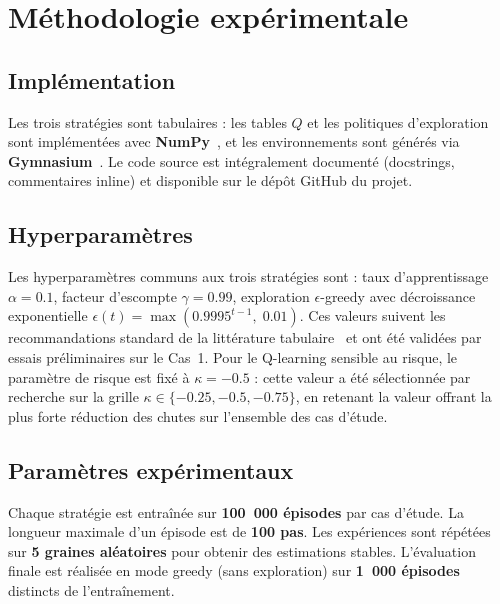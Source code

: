 \documentclass{article}
\begin{document}
\section{Méthodologie expérimentale}

\subsection{Implémentation}

Les trois stratégies sont tabulaires : les tables $Q$ et les politiques d'exploration sont implémentées avec \textbf{NumPy}~\citep{numpy}, et les environnements sont générés via \textbf{Gymnasium}~\citep{towers2024gymnasium}. Le code source est intégralement documenté (docstrings, commentaires inline) et disponible sur le dépôt GitHub du projet.

\subsection{Hyperparamètres}

Les hyperparamètres communs aux trois stratégies sont : taux d'apprentissage $\alpha = 0.1$, facteur d'escompte $\gamma = 0.99$, exploration $\epsilon$-greedy avec décroissance exponentielle $\epsilon(t) = \max(0.9995^{t-1},\; 0.01)$. Ces valeurs suivent les recommandations standard de la littérature tabulaire~\citep{rlbook} et ont été validées par essais préliminaires sur le Cas~1. Pour le Q-learning sensible au risque, le paramètre de risque est fixé à $\kappa = -0.5$ : cette valeur a été sélectionnée par recherche sur la grille $\kappa \in \{-0.25, -0.5, -0.75\}$, en retenant la valeur offrant la plus forte réduction des chutes sur l'ensemble des cas d'étude.

\subsection{Paramètres expérimentaux}

Chaque stratégie est entraînée sur \textbf{100~000 épisodes} par cas d'étude. La longueur maximale d'un épisode est de \textbf{100 pas}. Les expériences sont répétées sur \textbf{5 graines aléatoires} pour obtenir des estimations stables. L'évaluation finale est réalisée en mode greedy (sans exploration) sur \textbf{1~000 épisodes} distincts de l'entraînement.
\end{document}
